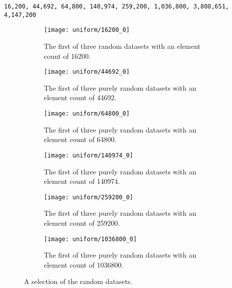 \begin{lstlisting}[label=lst:synthcounts,caption={[Element counts of the synthetic datasets.]Element counts of the synthetic datasets.}]
    16,200, 44,692, 64,800, 140,974, 259,200, 1,036,800, 3,808,651, 4,147,200
\end{lstlisting}

\begin{figure}[H]
    \centering
    \begin{subfigure}{0.4\textwidth}
        \texttt{[image: uniform/16200\_0]}
        \caption[The first of three purely random datasets with an element count of 16200.]{The first of three random datasets with an element count of 16200.}
        \label{sfig:uniform16200_0}
    \end{subfigure}\hfill
    \begin{subfigure}{0.4\textwidth}
        \texttt{[image: uniform/44692\_0]}
        \caption[The first of three purely random datasets with an element count of 44692.]{The first of three purely random datasets with an element count of 44692.}
        \label{sfig:uniform44692_0}
    \end{subfigure}\hfill
    \begin{subfigure}{0.4\textwidth}
        \texttt{[image: uniform/64800\_0]}
        \caption[The first of three purely random datasets with an element count of 64800.]{The first of three purely random datasets with an element count of 64800.}
        \label{sfig:uniform64800_0}
    \end{subfigure}\hfill
    \begin{subfigure}{0.4\textwidth}
        \texttt{[image: uniform/140974\_0]}
        \caption[The first of three purely random datasets with an element count of 140974.]{The first of three purely random datasets with an element count of 140974.}
        \label{sfig:uniform140974_0}
    \end{subfigure}\hfill
    \begin{subfigure}{0.4\textwidth}
        \texttt{[image: uniform/259200\_0]}
        \caption[The first of three purely random datasets with an element count of 259200.]{The first of three purely random datasets with an element count of 259200.}
        \label{sfig:uniform259200_0}
    \end{subfigure}\hfill
    \begin{subfigure}{0.4\textwidth}
        \texttt{[image: uniform/1036800\_0]}
        \caption[The first of three purely random datasets with an element count of 1036800.]{The first of three purely random datasets with an element count of 1036800.}
        \label{fig:uniform1036800_0}
    \end{subfigure}
    \caption[A selection of the random datasets.]{A selection of the random datasets.}
    \label{fig:uniform}
\end{figure}

